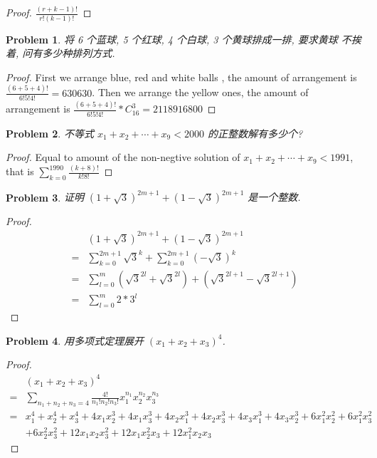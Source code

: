 \documentclass{ctexart}
\newtheorem{problem}{\textbf{Problem}}
\renewcommand{\(}{\left(}
\renewcommand{\)}{\right)}
\begin{document}
\begin{proof}
$\frac{(r+k-1)!}{r!(k-1)!}$
\end{proof}
\begin{problem}
将 6 个蓝球, 5 个红球, 4 个白球, 3 个黄球排成一排, 要求黄球 不挨着, 问有多少种排列方式.
\end{problem}
\begin{proof}
First we arrange blue, red and white balls , the amount of arrangement is $\frac{(6+5+4)!}{6!5!4!}=630630$. Then we arrange the yellow ones,  the amount of arrangement is $\frac{(6+5+4)!}{6!5!4!}*C_{16}^{3}=2118916800$
\end{proof}
\begin{problem}
不等式 $x_1+x_2+\cdots+x_9<2000$ 的正整数解有多少个?
\end{problem}
\begin{proof}
Equal to amount of the non-negtive solution of $x_1+x_2+\cdots+x_9<1991$, that is $\sum_{k=0}^{1990}\frac{(k+8)!}{k!8!}$
\end{proof}
\begin{problem}
证明 $(1+\sqrt{3})^{2 m+1}+(1-\sqrt{3})^{2 m+1}$ 是一个整数.
\end{problem}
\begin{proof}
\begin{equation}
\begin{aligned}
&(1+\sqrt{3})^{2 m+1}+(1-\sqrt{3})^{2 m+1}\\
=&\sum_{k=0}^{2m+1}\sqrt{3}^k+\sum_{k=0}^{2m+1}(-\sqrt{3})^k\\
=&\sum_{l=0}^{m}(\sqrt{3}^{2l}+\sqrt{3}^{2l})+(\sqrt{3}^{2l+1}-\sqrt{3}^{2l+1})\\
=&\sum_{l=0}^{m}2*3^l
\end{aligned}
\end{equation}
\end{proof}
\begin{problem}
用多项式定理展开 $\left(x_1+x_2+x_3\right)^4$.
\end{problem}
\begin{proof}
\begin{equation}
\begin{aligned}
& \left(x_1+x_2+x_3\right)^4\\
=&\sum_{n_1+n_2+n_3=4}\frac{4!}{n_1!n_2!n_3!}x_1^{n_1}x_2^{n_2}x_3^{n_3}\\
=&x_1^4+x_2^4+x_3^4+4x_1x_2^3+4x_1x_3^3+4x_2x_1^3+4x_2x_3^3+4x_3x_1^3+4x_3x_2^3+6x_1^2x_2^2+6x_1^2x_3^2\\
&+6x_2^2x_3^2+12x_1x_2x_3^2+12x_1x_2^2x_3+12x_1^2x_2x_3
\end{aligned}
\end{equation}
\end{proof}
\end{document}

